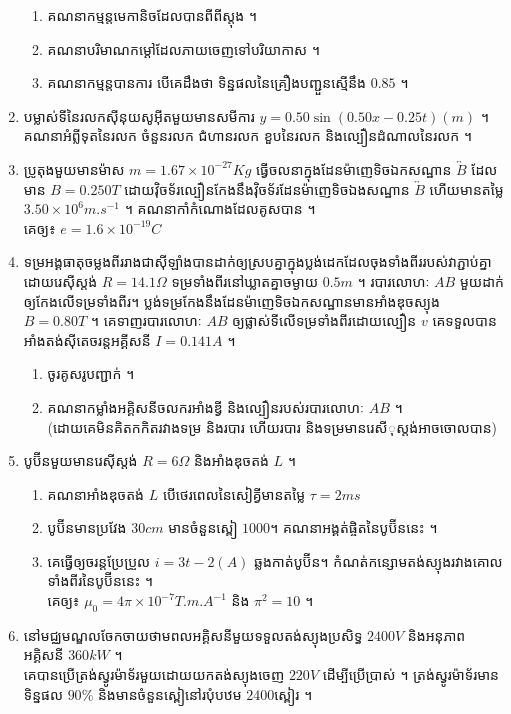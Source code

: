 \documentclass{officialexam}
\begin{document}
\begin{enumerate}[I]
		\begin{enumerate}[k]
			\item គណនាកម្មន្តមេកានិចដែលបានពីពីស្តុង ។
			\item គណនាបរិមាណកម្តៅដែលភាយចេញទៅបរិយាកាស ។
			\item គណនាកម្មន្តបានការ បើគេដឹងថា ទិន្នផលនៃគ្រឿងបញ្ជួនស្មើនឹង $0.85$ ។
		\end{enumerate}
		\item បម្លាស់ទីនៃរលកស៊ីនុយសូអុីតមួយមានសមីការ $y=0.50\sin(0.50x-0.25t)(m)$ ។\\
		គណនាអំព្លីទុតនៃរលក ចំនួនរលក ជំហានរលក ខួបនៃរលក និងល្បឿនដំណាលនៃរលក ។
		\item ប្រូតុងមួយមានម៉ាស $m=1.67\times10^{-27}Kg$ ធ្វើចលនាក្នុងដែនម៉ាញេទិចឯកសណ្ឋាន $\overleftrightarrow{B}$ ដែលមាន $B=0.250T$ ដោយវ៉ិចទ័រល្បឿនកែងនឹងវ៉ិចទ័រដែនម៉ាញេទិចឯងសណ្ឋាន $\overleftrightarrow{B}$ ហើយមានតម្លៃ $3.50\times10^6 m.s^{-1}$ ។ គណនាកាំកំណោងដែលគូសបាន ។\\ គេឲ្យ៖  $e=1.6\times10^{-19} C$
		\item ទម្រអង្គធាតុចម្លងពីររាងជាស៊ីឡាំងបានដាក់ឲ្យស្របគ្នាក្នុងប្លង់ដេកដែលចុងទាំងពីររបស់វាភ្ជាប់គ្នាដោយរេស៊ីស្តង់ $R=14.1 \Omega$ ទម្រទាំងពីរនៅឃ្លាតគ្នាចម្ងាយ $0.5 m$ ។ របារលោហៈ $AB$ មួយដាក់ឲ្យកែងលើទម្រទាំងពីរ។ ប្លង់ទម្រកែងនឹងដែនម៉ាញេទិចឯកសណ្ឋានមានអាំងឌុចស្យុង $B=0.80 T$ ។ គេទាញរបារលោហៈ $AB$ ឲ្យផ្លាស់ទីលើទម្រទាំងពីរដោយល្បឿន $v$ គេទទួលបានអាំងតង់ស៊ីតេចរន្តអគ្គីសនី $I=0.141A$ ។ 
		\begin{enumerate}[k]
			\item ចូរគូសរូបញ្ជាក់ ។
			\item គណនាកម្លាំងអគ្គិសនីចលករអាំងឌ្វី​ និងល្បឿនរបស់របារលោហៈ $AB$ ។​\\​(ដោយគេមិនគិតកកិតរវាងទម្រ និងរបារ​ ហើយរបារ និងទម្រមានរេសីុស្តង់អាចចោលបាន)
		\end{enumerate}
		\item បូប៊ីនមួយមានរេស៊ីស្តង់ $R=6\Omega$ និងអាំងឌុចតង់ $L$ ។
		\begin{enumerate}[k]
			\item គណនាអាំងឌុចតង់ $L$ បើថេរពេលនៃសៀគ្វីមានតម្លៃ $\tau=2 ms$
			\item បូប៊ីនមានប្រវែង $30 cm$ មានចំនួនស្ពៀ $1000$។ គណនាអង្គត់ផ្ចិតនៃបូប៊ីននេះ ។
			\item គេធ្វើឲ្យចរន្តប្រែប្រួល $i=3t-2 (A)$ ឆ្លងកាត់បូប៊ីន។ កំណត់កន្សោមតង់ស្យុងរវាងគោលទាំងពីរនៃបូប៊ីននេះ ។\\
			គេឲ្យ៖  $\mu_0=4\pi\times10^{-7}T.m.A^{-1}$ និង $\pi^2=10$ ។
		\end{enumerate}
		\item នៅមជ្ឈមណ្ឌលចែកចាយថាមពលអគ្គិសនីមួយទទួលតង់ស្យុងប្រសិទ្ធ $2400V$ និងអនុភាពអគ្គិសនី $360kW$ ។\\ គេបានប្រើត្រង់ស្វូរម៉ាទ័រមួយដោយយកតង់ស្យុងចេញ $220V$ ដើម្បីប្រើប្រាស់ ។ ត្រង់ស្វូរម៉ាទ័រមានទិន្នផល $90\%$ និងមានចំនួនស្ពៀនៅរបុំបឋម $2400$ស្ពៀរ ។

\end{enumerate}
\end{document}
